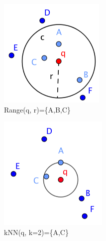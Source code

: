 \begin{figure}[htp]
\begin{subfigure}{.32\textwidth}
  \centering
  \includegraphics[width=.8\linewidth]{pic/rangeq.PNG}
  \caption{Range(q, r)=\{A,B,C\}}
\end{subfigure}%
\begin{subfigure}{.32\textwidth}
  \centering
  \includegraphics[width=.8\linewidth]{pic/knn.PNG}
  \caption{kNN(q, k=2)=\{A,C\}}
\end{subfigure}
\begin{subfigure}{.35\textwidth}

\end{subfigure}
\end{figure}
